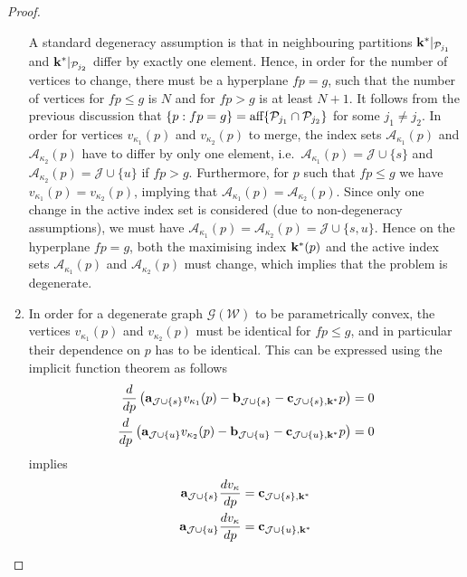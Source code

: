 \documentclass[journal]{IEEEtran}
\theoremstyle{remark}
\theoremstyle{definition}
\begin{document}
\begin{proof}
\begin{enumerate}
%
%
A standard degeneracy assumption is that in neighbouring partitions ${\bf{k}}^\ast\vert_{\mathcal P_{j_1}}$
and ${\bf{k}}^\ast\vert_{\mathcal P_{j_2}}$ differ by exactly one element.
%
Hence, in order for the number of vertices to change, there must be a hyperplane $fp=g$, such that the number of vertices for $fp \leq g$ is 
$N$ and for $fp>g$ is at least $N+1$.
%
It follows from the previous discussion that $\{p:fp=g\} = \textup{aff}\{\mathcal P_{j_1}\cap\mathcal P_{j_2}\}$ for some $j_1\neq j_2$.
%
In order for vertices $v_{\kappa_1}(p)$ and $v_{\kappa_2}(p)$ to merge, the index sets $\mathcal A_{\kappa_1}(p)$ and 
$\mathcal A_{\kappa_2}(p)$ have to differ by only one 
element, i.e.\ $\mathcal A_{\kappa_1}(p) = \mathcal J\cup \{s\}$ and $\mathcal A_{\kappa_2}(p) = \mathcal J\cup\{u\}$ if $fp>g$.
%
Furthermore, for $p$ such that $fp\leq g$ we have $v_{\kappa_1}(p)=v_{\kappa_2}(p)$, implying that $\mathcal A_{\kappa_1}(p) = 
\mathcal A_{\kappa_2}(p)$.
%
Since only one change in the active index set is considered (due to non-degeneracy assumptions), we must have
$\mathcal A_{\kappa_1}(p) = \mathcal A_{\kappa_2}(p) = \mathcal J \cup \{s,u\}$.
%
Hence on the hyperplane $fp=g$, both the maximising index ${\bf{k}}^\ast(p)$ and the active index sets $\mathcal A_{\kappa_1}(p)$ 
and $\mathcal A_{\kappa_2}(p)$ must change, which implies that the problem is degenerate.
%
\item In order for a degenerate graph $\mathscr G(\mathcal W)$ to be parametrically convex, the vertices $v_{\kappa_1}(p)$ and $v_{\kappa_2}(p)$ must be identical for $fp\leq g$, and in particular their dependence on $p$ has to be identical.
%
This can be expressed using the implicit function theorem as follows
%
\begin{align*}
  \frac{d}{dp}\left(  {\bf{a}}_{\mathcal J\cup \{s\}} v_{\kappa_1}(p) - {\bf{b}}_{\mathcal J\cup \{s\}} - 
  {\bf{c}}_{\mathcal J\cup \{s\},{\bf{k}}^\ast} p\right) &= 0\\
  \frac{d}{dp}\left(  {\bf{a}}_{\mathcal J\cup \{u\}} v_{\kappa_2}(p) - {\bf{b}}_{\mathcal J\cup \{u\}} - 
  {\bf{c}}_{\mathcal J\cup \{u\},{\bf{k}}^\ast} p\right) &= 0
\end{align*}
%
implies
\begin{align*}
  {\bf{a}}_{\mathcal J\cup \{s\}} \frac{dv_{\kappa}}{dp} &= {\bf{c}}_{\mathcal J\cup \{s\},{\bf{k}}^\ast}\\
  {\bf{a}}_{\mathcal J\cup \{u\}} \frac{dv_{\kappa}}{dp} &= {\bf{c}}_{\mathcal J\cup \{u\},{\bf{k}}^\ast}
\end{align*}

\end{enumerate}
\end{proof}
\end{document}
